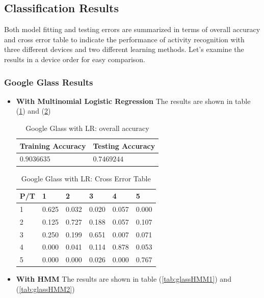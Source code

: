 \subsection{Classification Results}

Both model fitting and testing errors are summarized in terms of overall accuracy and cross error table to indicate the performance of activity recognition with three different devices and two different learning methods. Let's examine the results in a device order for easy comparison.

\subsubsection{Google Glass Results}
\label{sec:glassresult}
\begin{itemize}
\item \textbf{With Multinomial Logistic Regression} 
The results are shown in table (\ref{tab:glassLR1}) and (\ref{tab:glassLR2})

\begin{table}[h]
\begin{center}
\begin{tabular}{|l|l|}
      \hline
      Training Accuracy & Testing Accuracy\\
      \hline
      $0.9036635$ & $0.7469244$ \\
      \hline
\end{tabular}
\caption{Google Glass with LR: overall accuracy}
\label{tab:glassLR1}
\end{center}
\end{table}

\begin{table}[h]
\begin{center}
\begin{tabular}{|l|l|l|l|l|l|}
      \hline
      P/T& 1 & 2 &3 & 4 & 5 \\
      \hline
      1 &0.625&0.032&0.020&0.057&0.000\\
      2 &0.125&0.727&0.188&0.057&0.107\\
      3 &0.250&0.199&0.651&0.007&0.071\\
      4 &0.000&0.041&0.114&0.878&0.053\\
      5 & 0.000&0.000&0.026&0.000&0.767\\
      \hline
\end{tabular}
\caption{Google Glass with LR: Cross Error Table}
\label{tab:glassLR2}
\end{center}
\end{table}
\item \textbf{With HMM}
The results are shown in table (\ref{tab:glassHMM1}) and (\ref{tab:glassHMM2})


\end{itemize}
